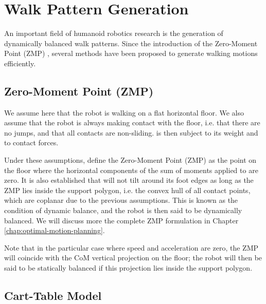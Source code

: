 \section{Walk Pattern Generation}
\label{sec:chap1-pattern-generator}

An important field of humanoid robotics research is the generation of
dynamically balanced walk patterns. Since the introduction of the
Zero-Moment Point (ZMP) \cite{vukobratovic1969contribution}, several
methods have been proposed to generate walking motions efficiently.

\subsection{Zero-Moment Point (ZMP)}
\label{subsec:chap1-zmp}

We assume here that the robot \robot is walking on a flat horizontal
floor. We also assume that the robot is always making contact with the
floor, i.e. that there are no jumps, and that all contacts are
non-sliding. \robot is then subject to its weight and to contact
forces.

Under these assumptions, \cite{vukobratovic1969contribution} define
the Zero-Moment Point (ZMP) as the point on the floor where the
horizontal components of the sum of moments applied to \robot are
zero. It is also established that \robot will not tilt around its foot
edges as long as the ZMP lies inside the support polygon, i.e. the
convex hull of all contact points, which are coplanar due to the
previous assumptions. This is known as the condition of dynamic
balance, and the robot \robot is then said to be dynamically
balanced. We will discuss more the complete ZMP formulation in Chapter
\ref{chap:optimal-motion-planning}.

Note that in the particular case where speed and acceleration are
zero, the ZMP will coincide with the CoM vertical projection on the
floor; the robot \robot will then be said to be statically balanced if
this projection lies inside the support polygon.

\subsection{Cart-Table Model}
\label{subsec:chap1-cart-table}

